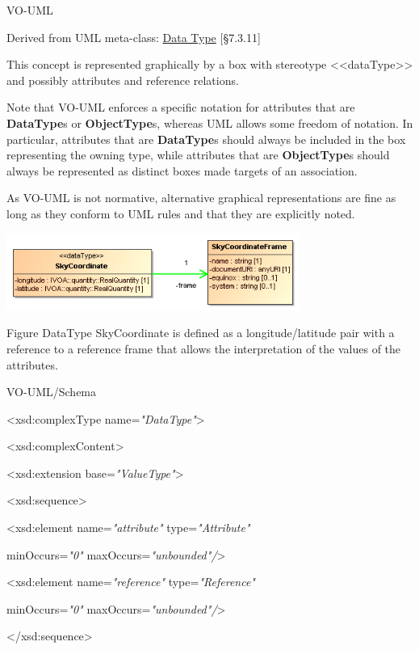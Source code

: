\documentclass[10pt,a4paper]{ivoa}
\begin{document}
VO-UML

Derived from UML meta-class:
\href{http://www.uml-diagrams.org/class-diagrams.html\#data-type}{Data
Type} {[}§7.3.11{]}

This concept is represented graphically by a box with stereotype
\textless\textless dataType\textgreater\textgreater{} and possibly
attributes and reference relations.

Note that VO-UML enforces a specific notation for attributes that are
\textbf{DataType}s or \textbf{ObjectType}s, whereas UML allows some
freedom of notation. In particular, attributes that are
\textbf{DataType}s should always be included in the box representing the
owning type, while attributes that are \textbf{ObjectType}s should
always be represented as distinct boxes made targets of an association.

As VO-UML is not normative, alternative graphical representations are
fine as long as they conform to UML rules and that they are explicitly
noted.

\includegraphics[width=3.76667in,height=0.99167in]{./media/image15.png}

Figure DataType SkyCoordinate is defined as a longitude/latitude pair
with a reference to a reference frame that allows the interpretation of
the values of the attributes.

VO-UML/Schema

\textless xsd:complexType name=\emph{"DataType"}\textgreater{}

\textless xsd:complexContent\textgreater{}

\textless xsd:extension base=\emph{"ValueType"}\textgreater{}

\textless xsd:sequence\textgreater{}

\textless xsd:element name=\emph{"attribute"} type=\emph{"Attribute"}

minOccurs=\emph{"0"} maxOccurs=\emph{"unbounded"/}\textgreater{}

\textless xsd:element name=\emph{"reference"} type=\emph{"Reference"}

minOccurs=\emph{"0"} maxOccurs=\emph{"unbounded"/}\textgreater{}

\textless/xsd:sequence\textgreater{}
\end{document}
